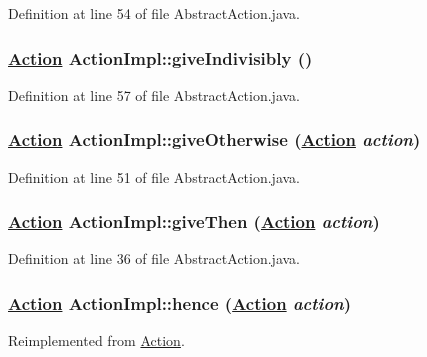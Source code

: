 Definition at line 54 of file Abstract\-Action.java.\hypertarget{classActionImpl_a9}{
\subsubsection[giveIndivisibly]{\setlength{\rightskip}{0pt plus 5cm}\hyperlink{interfaceAction}{Action} Action\-Impl::give\-Indivisibly ()}}
\label{classActionImpl_a9}




Definition at line 57 of file Abstract\-Action.java.\hypertarget{classActionImpl_a7}{
\subsubsection[giveOtherwise]{\setlength{\rightskip}{0pt plus 5cm}\hyperlink{interfaceAction}{Action} Action\-Impl::give\-Otherwise (\hyperlink{interfaceAction}{Action} {\em action})}}
\label{classActionImpl_a7}




Definition at line 51 of file Abstract\-Action.java.\hypertarget{classActionImpl_a2}{
\subsubsection[giveThen]{\setlength{\rightskip}{0pt plus 5cm}\hyperlink{interfaceAction}{Action} Action\-Impl::give\-Then (\hyperlink{interfaceAction}{Action} {\em action})}}
\label{classActionImpl_a2}




Definition at line 36 of file Abstract\-Action.java.\hypertarget{classActionImpl_a18}{
\subsubsection[hence]{\setlength{\rightskip}{0pt plus 5cm}\hyperlink{interfaceAction}{Action} Action\-Impl::hence (\hyperlink{interfaceAction}{Action} {\em action})}}
\label{classActionImpl_a18}




Reimplemented from \hyperlink{interfaceAction_a8}{Action}.

